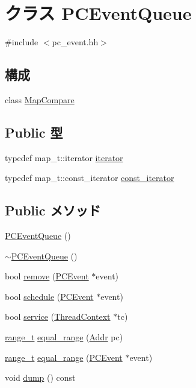 \hypertarget{classPCEventQueue}{
\section{クラス PCEventQueue}
\label{classPCEventQueue}
}


{\ttfamily \#include $<$pc\_\-event.hh$>$}\subsection*{構成}
\begin{DoxyCompactItemize}
\item 
class \hyperlink{classPCEventQueue_1_1MapCompare}{MapCompare}
\end{DoxyCompactItemize}
\subsection*{Public 型}
\begin{DoxyCompactItemize}
\item 
typedef map\_\-t::iterator \hyperlink{classPCEventQueue_a02720ab92b997d08a475408a87a9a378}{iterator}
\item 
typedef map\_\-t::const\_\-iterator \hyperlink{classPCEventQueue_a1b1044fb589ffa9451ee2a57f7649293}{const\_\-iterator}
\end{DoxyCompactItemize}
\subsection*{Public メソッド}
\begin{DoxyCompactItemize}
\item 
\hyperlink{classPCEventQueue_a718316a2d788aa19b6fc2bedf8213e23}{PCEventQueue} ()
\item 
\hyperlink{classPCEventQueue_aafeb23d2ec00e98724e77957cea69320}{$\sim$PCEventQueue} ()
\item 
bool \hyperlink{classPCEventQueue_a4a7ef09b8011f061e6d6624ed1de21b4}{remove} (\hyperlink{classPCEvent}{PCEvent} $\ast$event)
\item 
bool \hyperlink{classPCEventQueue_a3f0bfe2be12ac8f8e0ab5b1ad9633b8b}{schedule} (\hyperlink{classPCEvent}{PCEvent} $\ast$event)
\item 
bool \hyperlink{classPCEventQueue_a8060d68f4bd9328c674f6838dbb57494}{service} (\hyperlink{classThreadContext}{ThreadContext} $\ast$tc)
\item 
\hyperlink{classstd_1_1pair}{range\_\-t} \hyperlink{classPCEventQueue_a543c373cd519b8531e06bb3141f13678}{equal\_\-range} (\hyperlink{base_2types_8hh_af1bb03d6a4ee096394a6749f0a169232}{Addr} pc)
\item 
\hyperlink{classstd_1_1pair}{range\_\-t} \hyperlink{classPCEventQueue_af08617c0ba1693fcac0451031d9c09b9}{equal\_\-range} (\hyperlink{classPCEvent}{PCEvent} $\ast$event)
\item 
void \hyperlink{classPCEventQueue_a4a4fecb6d7cd9d0b8eb6579eee183af8}{dump} () const 
\end{DoxyCompactItemize}
